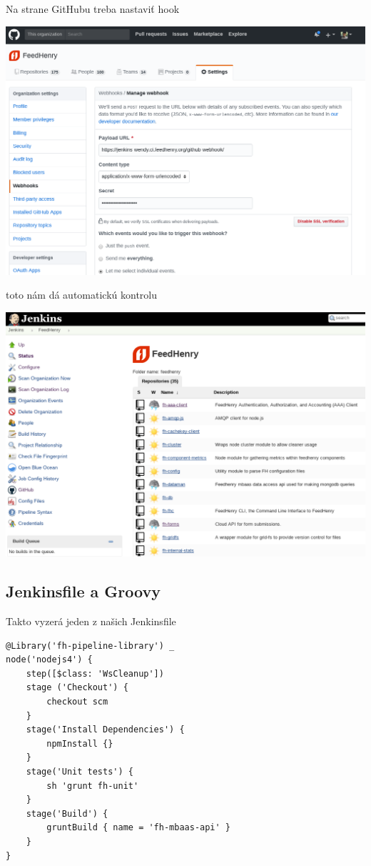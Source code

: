 \documentclass[bigger]{beamer}
\begin{document}
\begin{frame}[label={sec:orgf98768d}]{Na strane GitHubu treba nastaviť hook}
\begin{center}
\includegraphics[width=.9\linewidth]{./018gh_org_webhook.png}
\end{center}
\end{frame}

\begin{frame}[label={sec:org7e60d48}]{toto nám dá automatickú kontrolu}
\begin{center}
\includegraphics[width=.9\linewidth]{./019gh_org_list.png}
\end{center}
\end{frame}

\subsection{Jenkinsfile a Groovy}
\label{sec:org0560c55}

\begin{frame}[fragile,label={sec:org3178475}]{Takto vyzerá jeden z našich Jenkinsfile}
 \begin{verbatim}
@Library('fh-pipeline-library') _
node('nodejs4') {
    step([$class: 'WsCleanup'])
    stage ('Checkout') {
        checkout scm
    }
    stage('Install Dependencies') {
        npmInstall {}
    }
    stage('Unit tests') {
        sh 'grunt fh-unit'
    }
    stage('Build') {
        gruntBuild { name = 'fh-mbaas-api' }
    }
}
\end{verbatim}
\end{frame}
\end{document}

